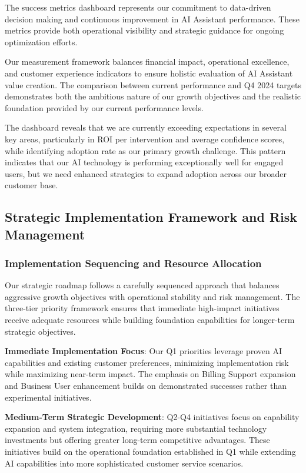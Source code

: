 \documentclass[
  letterpaper,
  DIV=11,
  numbers=noendperiod]{scrartcl}
\begin{document}
The success metrics dashboard represents our commitment to data-driven
decision making and continuous improvement in AI Assistant performance.
These metrics provide both operational visibility and strategic guidance
for ongoing optimization efforts.

Our measurement framework balances financial impact, operational
excellence, and customer experience indicators to ensure holistic
evaluation of AI Assistant value creation. The comparison between
current performance and Q4 2024 targets demonstrates both the ambitious
nature of our growth objectives and the realistic foundation provided by
our current performance levels.

The dashboard reveals that we are currently exceeding expectations in
several key areas, particularly in ROI per intervention and average
confidence scores, while identifying adoption rate as our primary growth
challenge. This pattern indicates that our AI technology is performing
exceptionally well for engaged users, but we need enhanced strategies to
expand adoption across our broader customer base.

\subsection{Strategic Implementation Framework and Risk
Management}\label{strategic-implementation-framework-and-risk-management}

\subsubsection{Implementation Sequencing and Resource
Allocation}\label{implementation-sequencing-and-resource-allocation}

Our strategic roadmap follows a carefully sequenced approach that
balances aggressive growth objectives with operational stability and
risk management. The three-tier priority framework ensures that
immediate high-impact initiatives receive adequate resources while
building foundation capabilities for longer-term strategic objectives.

\textbf{Immediate Implementation Focus}: Our Q1 priorities leverage
proven AI capabilities and existing customer preferences, minimizing
implementation risk while maximizing near-term impact. The emphasis on
Billing Support expansion and Business User enhancement builds on
demonstrated successes rather than experimental initiatives.

\textbf{Medium-Term Strategic Development}: Q2-Q4 initiatives focus on
capability expansion and system integration, requiring more substantial
technology investments but offering greater long-term competitive
advantages. These initiatives build on the operational foundation
established in Q1 while extending AI capabilities into more
sophisticated customer service scenarios.
\end{document}
